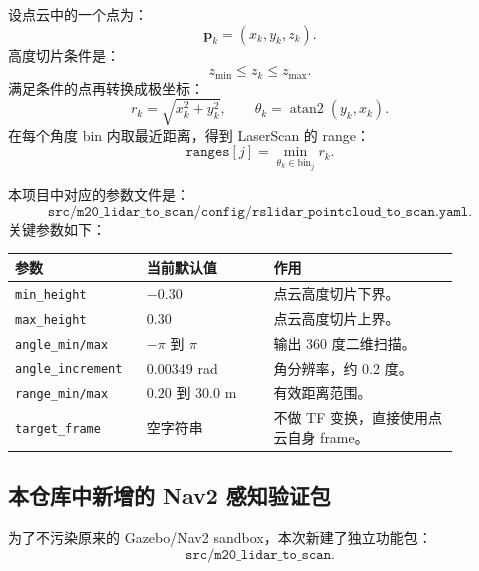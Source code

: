 \documentclass[UTF8,11pt,a4paper]{ctexart}
\newcommand{\bs}[1]{\bm{#1}}
\begin{document}
设点云中的一个点为：
\[
\bs p_k=(x_k,y_k,z_k).
\]
高度切片条件是：
\[
z_{\min}\le z_k\le z_{\max}.
\]
满足条件的点再转换成极坐标：
\[
r_k=\sqrt{x_k^2+y_k^2},\qquad
\theta_k=\operatorname{atan2}(y_k,x_k).
\]
在每个角度 bin 内取最近距离，得到 LaserScan 的 range：
\[
\texttt{ranges}[j]=\min_{\theta_k\in \text{bin}_j} r_k.
\]

本项目中对应的参数文件是：
\[
\texttt{src/m20\_lidar\_to\_scan/config/rslidar\_pointcloud\_to\_scan.yaml}.
\]
关键参数如下：

\begin{center}
\renewcommand{\arraystretch}{1.25}
\begin{tabular}{p{0.24\linewidth}p{0.26\linewidth}p{0.38\linewidth}}
\toprule
\textbf{参数} & \textbf{当前默认值} & \textbf{作用}\\
\midrule
\texttt{min\_height} & \(-0.30\) & 点云高度切片下界。\\
\texttt{max\_height} & \(0.30\) & 点云高度切片上界。\\
\texttt{angle\_min/max} & \(-\pi\) 到 \(\pi\) & 输出 360 度二维扫描。\\
\texttt{angle\_increment} & \(0.00349\) rad & 角分辨率，约 0.2 度。\\
\texttt{range\_min/max} & \(0.20\) 到 \(30.0\) m & 有效距离范围。\\
\texttt{target\_frame} & 空字符串 & 不做 TF 变换，直接使用点云自身 frame。\\
\bottomrule
\end{tabular}
\end{center}

\subsection{本仓库中新增的 Nav2 感知验证包}

为了不污染原来的 Gazebo/Nav2 sandbox，本次新建了独立功能包：
\[
\texttt{src/m20\_lidar\_to\_scan}.
\]
\end{document}
